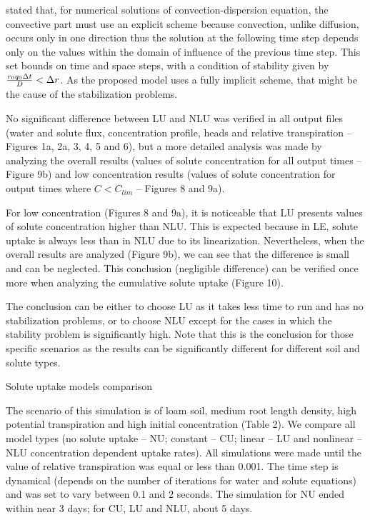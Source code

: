 \citeonline[roose2009] stated that, for numerical solutions of convection-dispersion equation, the convective part must use an explicit scheme because convection, unlike diffusion, occurs only in one direction thus the solution at the following time step depends only on the values within the domain of influence of the previous time step. This set bounds on time and space steps, with a condition of stability given by ${r_0 q_0 \Delta t \over D} < \Delta r$. As the proposed model uses a fully implicit scheme, that might be the cause of the stabilization problems.

No significant difference between LU and NLU was verified in all output files (water and solute flux, concentration profile, heads and relative transpiration – Figures 1a, 2a, 3, 4, 5 and 6), but a more detailed analysis was made by analyzing the overall results (values of solute concentration for all output times -- Figure 9b) and low concentration results (values of solute concentration for output times where $C<C_{lim}$ -- Figures 8 and 9a).

For low concentration (Figures 8 and 9a), it is noticeable that LU presents values of solute concentration higher than NLU. This is expected because in LE, solute uptake is always less than in NLU due to its linearization. Nevertheless, when the overall results are analyzed (Figure 9b), we can see that the difference is small and can be neglected. This conclusion (negligible difference) can be verified once more when analyzing the cumulative solute uptake (Figure 10). 

The conclusion can be either to choose LU as it takes less time to run and has no stabilization problems, or to choose NLU except for the cases in which the stability problem is significantly high. Note that this is the conclusion for those specific scenarios as the results can be significantly different for different soil and solute types.


\sec Solute uptake models comparison

The scenario of this simulation is of loam soil, medium root length density, high potential transpiration and high initial concentration (Table 2). We compare all model types (no solute uptake -- NU; constant -- CU; linear -- LU and nonlinear -- NLU concentration dependent uptake rates). All simulations were made until the value of relative transpiration was equal or less than 0.001. The time step is dynamical (depends on the number of iterations for water and solute equations) and was set to vary between 0.1 and 2 seconds. The simulation for NU ended within near 3 days; for CU, LU and NLU, about 5 days.

